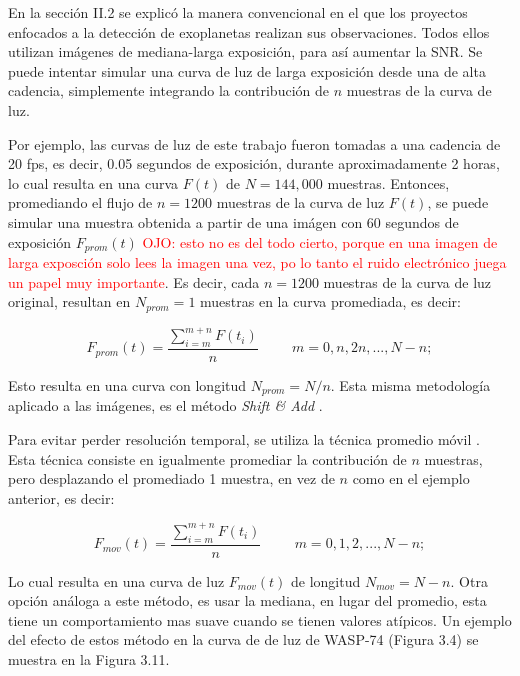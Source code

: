 En la sección II.2 se explicó la manera convencional en el que los proyectos enfocados a la detección de exoplanetas realizan sus observaciones. Todos ellos utilizan imágenes de mediana-larga exposición, para así aumentar la SNR. Se puede intentar simular una curva de luz de larga exposición desde una de alta cadencia, simplemente integrando la contribución de $n$ muestras de la curva de luz. 

Por ejemplo, las curvas de luz de este trabajo fueron tomadas a una cadencia de 20 fps, es decir, 0.05 segundos de exposición, durante aproximadamente 2 horas, lo cual resulta en una curva $F(t)$ de $N=144,000$ muestras. Entonces, promediando el flujo de $n=1200$ muestras de la curva de luz $F(t)$, se puede simular una muestra obtenida a partir de una imágen con 60 segundos de exposición $F_{prom}(t)$ \textcolor{red}{OJO: esto no es del todo cierto, porque en una imagen de larga exposción solo lees la imagen una vez, po lo tanto el ruido electrónico juega un papel muy importante}. Es decir, cada $n=1200$ muestras de la curva de luz original, resultan en $N_{prom}=1$ muestras en la curva promediada, es decir:

\begin{equation}
  \displaystyle F_{prom}(t)=  \dfrac{\sum\limits_{i=m}^{m+n} F(t_{i})}{n}\hspace{1cm}m=0,n,2n,...,N-n;
\end{equation}

Esto resulta en una curva con longitud $N_{prom}=N/n$. Esta misma metodología aplicado a las imágenes, es el método \textit{Shift \& Add} \cite{kluckers1996comparison}.

Para evitar perder resolución temporal, se utiliza la técnica promedio móvil \cite{borucki2009kepler}. Esta técnica consiste en igualmente promediar la contribución de $n$ muestras, pero desplazando el promediado 1 muestra, en vez de $n$ como en el ejemplo anterior, es decir:

\begin{equation}
  \displaystyle  F_{mov}(t)=  \dfrac{\sum\limits_{i=m}^{m+n} F(t_{i})}{n}\hspace{1cm}m=0,1,2,...,N-n;
\end{equation}

Lo cual resulta en una curva de luz $F_{mov}(t)$ de longitud  $N_{mov}=N-n$. Otra opción análoga a este método, es usar la mediana, en lugar del promedio, esta tiene un comportamiento mas suave cuando se tienen valores atípicos. Un ejemplo del efecto de estos método en la curva de de luz de WASP-74 (Figura 3.4) se muestra en la Figura 3.11.

